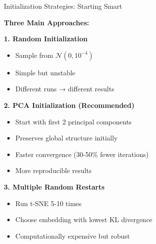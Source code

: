 \documentclass[10pt]{beamer}
\begin{document}
\begin{frame}{Initialization Strategies: Starting Smart}

\textbf{Three Main Approaches:}

\vspace{0.2cm}
\textbf{1. Random Initialization}
\begin{itemize}
    \setlength\itemsep{0em}
    \item Sample from $\mathcal{N}(0, 10^{-4})$ 
    \item Simple but unstable
    \item Different runs → different results
\end{itemize}

\vspace{0.15cm}
\textbf{2. PCA Initialization (Recommended)}
\begin{itemize}
    \setlength\itemsep{0em}
    \item Start with first 2 principal components
    \item Preserves global structure initially
    \item Faster convergence (30-50\% fewer iterations)
    \item More reproducible results
\end{itemize}

\vspace{0.15cm}
\textbf{3. Multiple Random Restarts}
\begin{itemize}
    \setlength\itemsep{0em}
    \item Run t-SNE 5-10 times
    \item Choose embedding with lowest KL divergence
    \item Computationally expensive but robust
\end{itemize}

\vspace{0.15cm}
\begin{figure}
\centering
{}
\end{figure}

\end{frame}
\end{document}
